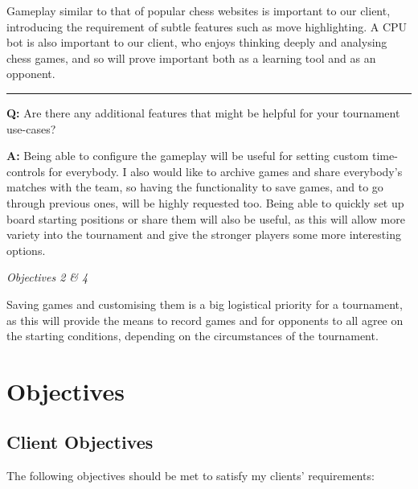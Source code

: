 \documentclass[../main/main.tex]{subfiles}
\begin{document}
\noindent Gameplay similar to that of popular chess websites is important to our client, introducing the requirement of subtle features such as move highlighting. A CPU bot is also important to our client, who enjoys thinking deeply and analysing chess games, and so will prove important both as a learning tool and as an opponent.

\noindent\rule{\textwidth}{0.4pt}

\noindent\textbf{Q:} Are there any additional features that might be helpful for your tournament use-cases?

\noindent\textbf{A:} Being able to configure the gameplay will be useful for setting custom time-controls for everybody. I also would like to archive games and share everybody’s matches with the team, so having the functionality to save games, and to go through previous ones, will be highly requested too. Being able to quickly set up board starting positions or share them will also be useful, as this will allow more variety into the tournament and give the stronger players some more interesting options.

\bigskip

\noindent\textit{Objectives 2 \& 4}

\noindent Saving games and customising them is a big logistical priority for a tournament, as this will provide the means to record games and for opponents to all agree on the starting conditions, depending on the circumstances of the tournament.

\section{Objectives}
\subsection{Client Objectives}
The following objectives should be met to satisfy my clients’ requirements:

\newcommand\objitem{\item\label{obj:\theenumi\theenumii}}
\end{document}
